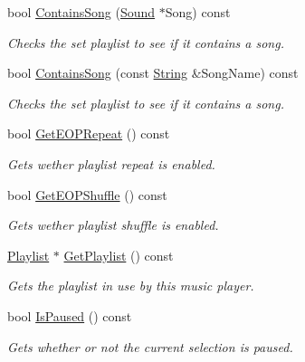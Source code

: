 \begin{DoxyCompactItemize}
\item 
bool \hyperlink{classMezzanine_1_1Audio_1_1MusicPlayer_a0008726842f3562c1c6de2885dd0c837}{ContainsSong} (\hyperlink{classMezzanine_1_1Audio_1_1Sound}{Sound} $\ast$Song) const 
\begin{DoxyCompactList}\small\item\em Checks the set playlist to see if it contains a song. \item\end{DoxyCompactList}\item 
bool \hyperlink{classMezzanine_1_1Audio_1_1MusicPlayer_a4b4db10e2b7a29a0093337be44963f75}{ContainsSong} (const \hyperlink{namespaceMezzanine_acf9fcc130e6ebf08e3d8491aebcf1c86}{String} \&SongName) const 
\begin{DoxyCompactList}\small\item\em Checks the set playlist to see if it contains a song. \item\end{DoxyCompactList}\item 
bool \hyperlink{classMezzanine_1_1Audio_1_1MusicPlayer_a1cb8dcb219f5c3f2fa8f4ddb1cd2bfc8}{GetEOPRepeat} () const 
\begin{DoxyCompactList}\small\item\em Gets wether playlist repeat is enabled. \item\end{DoxyCompactList}\item 
bool \hyperlink{classMezzanine_1_1Audio_1_1MusicPlayer_a3dee1170bf17a44dd6be88240013445c}{GetEOPShuffle} () const 
\begin{DoxyCompactList}\small\item\em Gets wether playlist shuffle is enabled. \item\end{DoxyCompactList}\item 
\hyperlink{classMezzanine_1_1Audio_1_1Playlist}{Playlist} $\ast$ \hyperlink{classMezzanine_1_1Audio_1_1MusicPlayer_af6cfa25522094f4e2881aab04e918136}{GetPlaylist} () const 
\begin{DoxyCompactList}\small\item\em Gets the playlist in use by this music player. \item\end{DoxyCompactList}\item 
bool \hyperlink{classMezzanine_1_1Audio_1_1MusicPlayer_ab225e4724df32be12cef403fa2f41071}{IsPaused} () const 
\begin{DoxyCompactList}\small\item\em Gets whether or not the current selection is paused. \item\end{DoxyCompactList}\item 

\end{DoxyCompactItemize}
